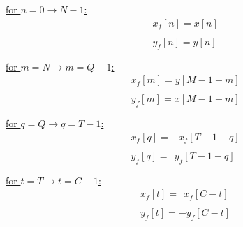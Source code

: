 \documentclass{article}
\begin{document}
\begin{enumerate}
          \underline{for $n = 0 \rightarrow N - 1$:} \\
            \begin{align*}
                &x_{f}[n] = x[n] \\ \\
                &y_{f}[n] = y[n] \\ \\
              \end{align*}
          \underline{for $m = N \rightarrow m = Q - 1$:} \\
            \begin{align*}
                &x_{f}[m] = y[M - 1 - m] \\ \\
                &y_{f}[m] = x[M - 1 - m] \\ \\
              \end{align*}
          \underline{for $q = Q \rightarrow q = T - 1$:} \\
             \begin{align*}
                &x_{f}[q] =    -x_{f}[T - 1 - q] \\ \\
                &y_{f}[q] = \ \ y_{f}[T - 1 - q] \\ \\
               \end{align*}
          \underline{for $t = T \rightarrow t = C - 1$:} \\
             \begin{align*}
                &x_{f}[t] = \ \ x_{f}[C - t] \\ \\
                &y_{f}[t] =    -y_{f}[C - t] \\ \\
               \end{align*}
\end{enumerate}
\end{document}
